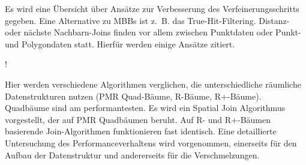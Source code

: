 \documentclass[a4paper,12pt,twoside]{article}
\begin{document}
Es wird eine Übersicht über Ansätze zur Verbesserung des Verfeinerungsschritts gegeben. Eine Alternative zu MBBs  ist z.~B. das True-Hit-Filtering. Distanz- oder nächste Nachbarn-Joins finden vor allem zwischen Punktdaten oder Punkt- und Polygondaten statt. Hierfür werden einige Ansätze zitiert.

\textbf{}!

Hier werden verschiedene Algorithmen verglichen, die unterschiedliche räumliche Datenstrukturen nutzen (PMR Quad-Bäume, R-Bäume, R+-Bäume). Quadbäume sind am performantesten. Es wird ein Spatial Join Algorithmus vorgestellt, der auf PMR Quadbäumen beruht. Auf R- und R+-Bäumen basierende Join-Algorithmen funktionieren fast identisch. Eine detaillierte Untersuchung des Performanceverhaltens wird vorgenommen, einerseits für den Aufbau der Datenstruktur und andererseits für die Verschmelzungen.

\end{document}
